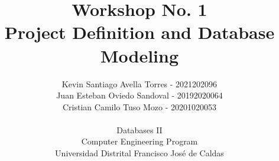 

\title{Workshop No. 1 \\
Project Definition and Database Modeling}
\author{Kevin Santiago Avella Torres - 2021202096 \\
  Juan Esteban Oviedo Sandoval - 20192020064 \\
  Cristian Camilo Tuso Mozo - 20201020053 \\
  \\
  \small Databases II \\
  \small Computer Engineering Program \\
  \small Universidad Distrital Francisco José de Caldas
}


\maketitle










